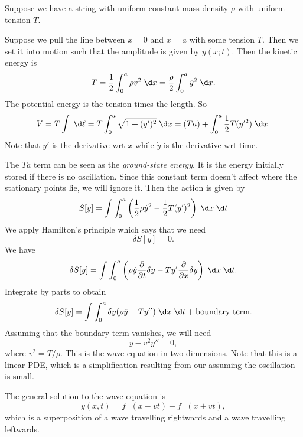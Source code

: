 \documentclass[a4paper]{article}
\begin{document}
\begin{eg}
  Suppose we have a string with uniform constant mass density $\rho$ with uniform tension $T$.
  \begin{center}
  \end{center}
  Suppose we pull the line between $x = 0$ and $x = a$ with some tension $T$. Then we set it into motion such that the amplitude is given by $y(x; t)$. Then the kinetic energy is
  \[
    T = \frac{1}{2}\int_0^a \rho v^2\;\d x = \frac{\rho}{2}\int_0^a \dot{y}^2 \;\d x.
  \]
  The potential energy is the tension times the length. So
  \[
    V = T\int \;\d \ell = T\int_0^a\sqrt{1 + (y')^2}\;\d x = (Ta) + \int_0^a \frac{1}{2}T(y'^2)\;\d x.
  \]
  Note that $y'$ is the derivative wrt $x$ while $\dot{y}$ is the derivative wrt time.

  The $Ta$ term can be seen as the \emph{ground-state energy}. It is the energy initially stored if there is no oscillation. Since this constant term doesn't affect where the stationary points lie, we will ignore it. Then the action is given by
  \[
    S[y] = \int \int_0^a \left(\frac{1}{2}\rho \dot{y}^2 - \frac{1}{2}T(y')^2\right)\;\d x\;\d t
  \]
  We apply Hamilton's principle which says that we need
  \[
    \delta S[y] = 0.
  \]
  We have
  \[
    \delta S[y] = \int \int_0^a \left(\rho \dot{y} \frac{\partial}{\partial t}\delta y - Ty' \frac{\partial}{\partial x}\delta y\right)\;\d x\;\d t.
  \]
  Integrate by parts to obtain
  \[
    \delta S[y] = \int \int_0^a \delta y(\rho \ddot{y} - Ty'')\;\d x\;\d t + \text{boundary term}.
  \]
  Assuming that the boundary term vanishes, we will need
  \[
    \ddot{y} - v^2 y'' = 0,
  \]
  where $v^2 = T/\rho$. This is the wave equation in two dimensions. Note that this is a linear PDE, which is a simplification resulting from our assuming the oscillation is small.

  The general solution to the wave equation is
  \[
    y(x, t) = f_+(x - vt) + f_-(x + vt),
  \]
  which is a superposition of a wave travelling rightwards and a wave travelling leftwards.
\end{eg}
\end{document}

